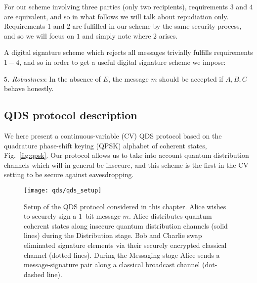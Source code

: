 For our scheme involving three parties (only two recipients), requirements $3$ and $4$ are equivalent, and so in what follows we will talk about repudiation only. Requirements $1$ and $2$ are fulfilled in our scheme by the same security process, and so we will focus on $1$ and simply note where $2$ arises.


A digital signature scheme which rejects all messages trivially fulfills requirements $1-4$, and so in order to get a useful digital signature scheme we impose:

\noindent \emph{$5$. Robustness}: In the absence of $E$, the message $m$ should be accepted if $A, B, C$ behave honestly.

\subsection{QDS protocol description}

We here present a continuous-variable (CV) QDS protocol based on the quadrature phase-shift keying (QPSK) alphabet of coherent states, Fig.~\ref{fig:qpsk}. %
Our protocol allows us to take into account quantum distribution channels which will in general be insecure, and this scheme is the first in the CV setting to be secure against eavesdropping. 

\begin{figure}[htp]
\centering
\texttt{[image: qds/qds\_setup]}
\caption{\label{fig:qds_setup}  Setup of the QDS protocol considered in this chapter. Alice wishes to securely sign a $1$~bit message $m$. Alice distributes quantum coherent states along insecure quantum distribution channels (solid lines) during the Distribution stage. Bob and Charlie swap eliminated signature elements via their securely encrypted classical channel (dotted lines). During the Messaging stage Alice sends a message-signature pair along a classical broadcast channel (dot-dashed line).}
\end{figure}


